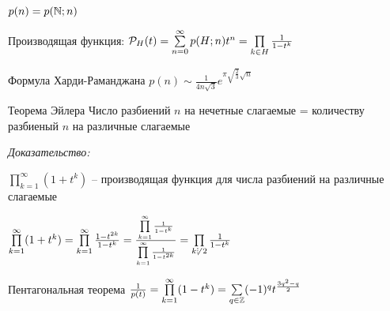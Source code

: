 \documentclass[12pt]{article}
\begin{document}
\begin{defin}{}
    $p(n) = p(\N; n)$

    Производящая функция: $\P_H(t) = \sum\limits_{n = 0}^\infty p(H; n)t^n = \prod\limits_{k \in H} \frac{1}{1 - t^k}$
\end{defin}

\begin{theo}{Формула Харди-Раманджана}
    $p(n) \sim \frac{1}{4n\sqrt{3}} e^{\pi \sqrt{\frac{2}{3}}\sqrt{n}}$
\end{theo}

\begin{theo}{Теорема Эйлера}
    Число разбиений $n$ на нечетные слагаемые = количеству разбиеный $n$ на различные слагаемые
\end{theo}

\textit{Доказательство:}

$\prod\limits_{k = 1}^\infty (1 + t^k)$ -- производящая функция для числа разбиений на различные слагаемые 

$\prod\limits_{k = 1}^\infty (1 + t^k) = \prod\limits_{k = 1}^\infty \frac{1 - t^{2k}}{1 - t^k} = \frac{\prod\limits_{k = 1}^\infty \frac{1}{1 - t^k}}{\prod\limits_{k = 1}^\infty \frac{1}{1 - t^{2k}}} = \prod\limits_{k \not\divby\ 2} \frac{1}{1 - t^k}$

\begin{theo}{Пентагональная теорема}
    $\frac{1}{p(t)} = \prod\limits_{k = 1}^\infty (1 - t^k) = \sum\limits_{q \in \Z} (-1)^q t^{\frac{3q^2 - q}{2}}$
\end{theo}
\end{document}

